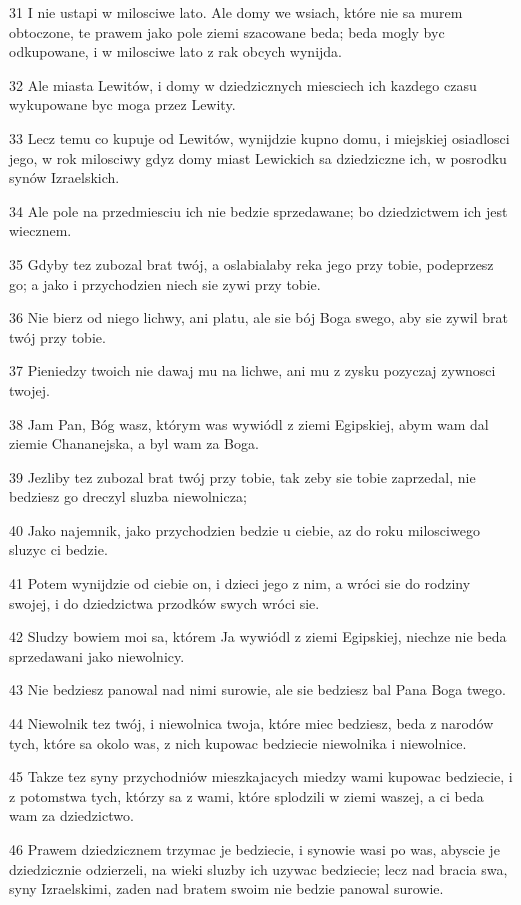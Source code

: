 \par 31 I nie ustapi w milosciwe lato. Ale domy we wsiach, które nie sa murem obtoczone, te prawem jako pole ziemi szacowane beda; beda mogly byc odkupowane, i w milosciwe lato z rak obcych wynijda.
\par 32 Ale miasta Lewitów, i domy w dziedzicznych miesciech ich kazdego czasu wykupowane byc moga przez Lewity.
\par 33 Lecz temu co kupuje od Lewitów, wynijdzie kupno domu, i miejskiej osiadlosci jego, w rok milosciwy gdyz domy miast Lewickich sa dziedziczne ich, w posrodku synów Izraelskich.
\par 34 Ale pole na przedmiesciu ich nie bedzie sprzedawane; bo dziedzictwem ich jest wiecznem.
\par 35 Gdyby tez zubozal brat twój, a oslabialaby reka jego przy tobie, podeprzesz go; a jako i przychodzien niech sie zywi przy tobie.
\par 36 Nie bierz od niego lichwy, ani platu, ale sie bój Boga swego, aby sie zywil brat twój przy tobie.
\par 37 Pieniedzy twoich nie dawaj mu na lichwe, ani mu z zysku pozyczaj zywnosci twojej.
\par 38 Jam Pan, Bóg wasz, którym was wywiódl z ziemi Egipskiej, abym wam dal ziemie Chananejska, a byl wam za Boga.
\par 39 Jezliby tez zubozal brat twój przy tobie, tak zeby sie tobie zaprzedal, nie bedziesz go dreczyl sluzba niewolnicza;
\par 40 Jako najemnik, jako przychodzien bedzie u ciebie, az do roku milosciwego sluzyc ci bedzie.
\par 41 Potem wynijdzie od ciebie on, i dzieci jego z nim, a wróci sie do rodziny swojej, i do dziedzictwa przodków swych wróci sie.
\par 42 Sludzy bowiem moi sa, którem Ja wywiódl z ziemi Egipskiej, niechze nie beda sprzedawani jako niewolnicy.
\par 43 Nie bedziesz panowal nad nimi surowie, ale sie bedziesz bal Pana Boga twego.
\par 44 Niewolnik tez twój, i niewolnica twoja, które miec bedziesz, beda z narodów tych, które sa okolo was, z nich kupowac bedziecie niewolnika i niewolnice.
\par 45 Takze tez syny przychodniów mieszkajacych miedzy wami kupowac bedziecie, i z potomstwa tych, którzy sa z wami, które splodzili w ziemi waszej, a ci beda wam za dziedzictwo.
\par 46 Prawem dziedzicznem trzymac je bedziecie, i synowie wasi po was, abyscie je dziedzicznie odzierzeli, na wieki sluzby ich uzywac bedziecie; lecz nad bracia swa, syny Izraelskimi, zaden nad bratem swoim nie bedzie panowal surowie.
